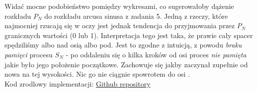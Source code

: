 \documentclass{article}
\begin{document}
Widać mocne podobieństwo pomiędzy wykresami, co sugerowałoby dążenie rozkładu \( P_N \) do rozkładu arcusa sinusa z zadania 5.
Jedną z rzeczy, które najmocniej rzucają się w oczy jest jednak tendencja do przyjmowania przez \( P_N \) granicznych wartości (0 lub 1).
Interpretacja tego jest taka, że prawie cały spacer spędziliśmy albo nad osią  albo pod.
Jest to zgodne z intuicją, z powodu \textit{braku pamięci} procesu \( S_N \) - po oddaleniu się o kilka kroków od osi  
proces \textit{nie pamięta} jakie było jego położenie początkowe. Zachowuje się jakby zaczynał zupełnie od nowa na tej wysokości.
Nic go nie ciągnie spowrotem do osi .\\


Kod zrodlowy implementacji: \href{https://github.com/nskowron/Statistics2024/tree/main/Exc4}{Github repository}
\end{document}
